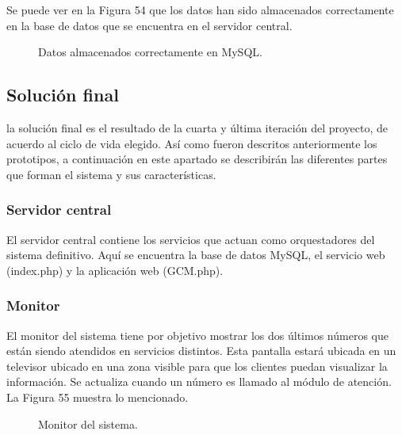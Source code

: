 Se puede ver en la Figura 54 que los datos han sido almacenados correctamente en la base de datos que se encuentra en el servidor central.\\

\begin{figure}[H]
\centering
\setlength\fboxsep{0pt}
\setlength\fboxrule{0.5pt}
\caption{Datos almacenados correctamente en MySQL.}
\label{registrarDispositivo}
\end{figure}


\subsection{Solución final}

la solución final es el resultado de la cuarta y última iteración del proyecto, de acuerdo al ciclo de vida elegido. Así como fueron descritos anteriormente los prototipos, a continuación en este apartado se describirán las diferentes partes que forman el sistema y sus características.

\subsubsection{Servidor central}

El servidor central contiene los servicios que actuan como orquestadores del sistema definitivo. Aquí se encuentra la base de datos MySQL, el servicio web (index.php) y la aplicación web (GCM.php).\\ 

\subsubsection{Monitor}

El monitor del sistema tiene por objetivo mostrar los dos últimos números que están siendo atendidos en servicios distintos. Esta pantalla estará ubicada en un televisor ubicado en una zona visible para que los clientes puedan visualizar la información. Se actualiza cuando un número es llamado al módulo de atención. La Figura 55 muestra lo mencionado.

\begin{figure}[H]
\centering
\setlength\fboxsep{0pt}
\setlength\fboxrule{0.5pt}
\caption{Monitor del sistema.}
\label{registrarDispositivo}
\end{figure}

